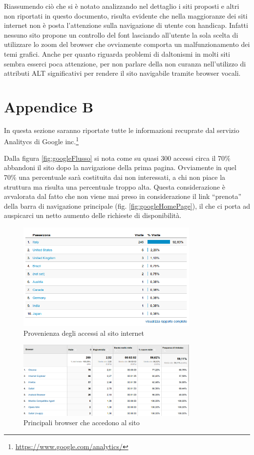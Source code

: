 \documentclass[a4paper,12pt,hidelinks]{report}
\begin{document}
  Riassumendo ciò che si è notato analizzando nel dettaglio i siti proposti e altri non riportati in questo documento, risulta evidente che nella maggioranze dei siti internet
  non è posta l'attenzione sulla navigazione di utente con handicap. Infatti nessuno sito propone un controllo del font lasciando all'utente la sola scelta di utilizzare 
  lo zoom del browser che ovviamente comporta un malfunzionamento dei temi grafici. 
  Anche per quanto riguarda problemi di daltonismi in molti siti sembra esserci poca attenzione, per non parlare della non curanza nell'utilizzo di attributi ALT significativi
  per rendere il sito navigabile tramite browser vocali.
  
\section{Appendice B}
  In questa sezione saranno riportate tutte le informazioni recuprate dal servizio Analitycs di Google inc.\footnote{\url{https://www.google.com/analytics/}}
  \par Dalla figura \ref{fig:googleFlusso} si nota come su quasi 300 accessi circa il 70\% abbandoni il sito dopo la navigazione della prima pagina. Ovviamente in quel 70\% una 
  percentuale sarà costituita dai non interessati, a chi non piace la struttura ma risulta una percentuale troppo alta. Questa considerazione è avvalorata dal fatto che 
  non viene mai preso in considerazione il link ``prenota'' della barra di navigazione principale (fig. \ref{fig:googleHomePage}), il che ci porta ad auspicarci un netto aumento delle richieste di
  disponibilità.
  \begin{figure}[h!]%
    \includegraphics[width=0.80\textwidth,keepaspectratio=true]{img/googleAnalyticsPaesi}
    \centering
    \caption{Provenienza degli accessi al sito internet}%
    \label{fig:googleAnalyticsPaesi}%
  \end{figure}
  \begin{figure}[h!]%
    \includegraphics[width=0.80\textwidth,keepaspectratio=true]{img/googleAnalyticsBrowser}
    \centering
    \caption{Principali browser che accedono al sito}%
    \label{fig:googleAnalyticsBrowser}%
  \end{figure}
\end{document}
